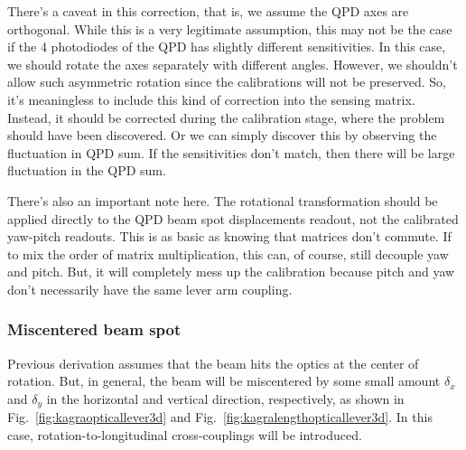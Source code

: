 There's a caveat in this correction, that is, we assume the QPD axes are orthogonal.
While this is a very legitimate assumption, this may not be the case if the 4 photodiodes of the QPD has slightly different sensitivities.
In this case, we should rotate the axes separately with different angles.
However, we shouldn't allow such asymmetric rotation since the calibrations will not be preserved.
So, it's meaningless to include this kind of correction into the sensing matrix.
Instead, it should be corrected during the calibration stage, where the problem should have been discovered.
Or we can simply discover this by observing the fluctuation in QPD sum.
If the sensitivities don't match, then there will be large fluctuation in the QPD sum.

There's also an important note here.
The rotational transformation should be applied directly to the QPD beam spot displacements readout, not the calibrated yaw-pitch readouts.
This is as basic as knowing that matrices don't commute.
If to mix the order of matrix multiplication,
this can, of course, still decouple yaw and pitch.
But, it will completely mess up the calibration because pitch and yaw don't necessarily have the same lever arm coupling.

\subsubsection{Miscentered beam spot \label{sec:miscentered_beam_spot}}
Previous derivation assumes that the beam hits the optics at the center of rotation.
But, in general, the beam will be miscentered by some small amount $\delta_x$ and $\delta_y$ in the horizontal and vertical direction, respectively, as shown in Fig.~\ref{fig:kagraopticallever3d} and Fig.~\ref{fig:kagralengthopticallever3d}.
In this case, rotation-to-longitudinal cross-couplings will be introduced.

